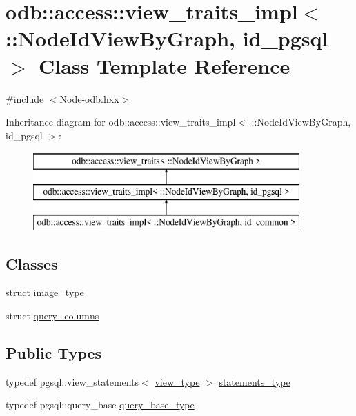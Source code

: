 \hypertarget{classodb_1_1access_1_1view__traits__impl_3_01_1_1_node_id_view_by_graph_00_01id__pgsql_01_4}{}\section{odb\+:\+:access\+:\+:view\+\_\+traits\+\_\+impl$<$ \+:\+:Node\+Id\+View\+By\+Graph, id\+\_\+pgsql $>$ Class Template Reference}
\label{classodb_1_1access_1_1view__traits__impl_3_01_1_1_node_id_view_by_graph_00_01id__pgsql_01_4}


{\ttfamily \#include $<$Node-\/odb.\+hxx$>$}

Inheritance diagram for odb\+:\+:access\+:\+:view\+\_\+traits\+\_\+impl$<$ \+:\+:Node\+Id\+View\+By\+Graph, id\+\_\+pgsql $>$\+:\begin{figure}[H]
\begin{center}
\leavevmode
\includegraphics[height=3.000000cm]{d2/dd4/classodb_1_1access_1_1view__traits__impl_3_01_1_1_node_id_view_by_graph_00_01id__pgsql_01_4}
\end{center}
\end{figure}
\subsection*{Classes}
\begin{DoxyCompactItemize}
\item 
struct \hyperlink{structodb_1_1access_1_1view__traits__impl_3_01_1_1_node_id_view_by_graph_00_01id__pgsql_01_4_1_1image__type}{image\+\_\+type}
\item 
struct \hyperlink{structodb_1_1access_1_1view__traits__impl_3_01_1_1_node_id_view_by_graph_00_01id__pgsql_01_4_1_1query__columns}{query\+\_\+columns}
\end{DoxyCompactItemize}
\subsection*{Public Types}
\begin{DoxyCompactItemize}
\item 
typedef pgsql\+::view\+\_\+statements$<$ \hyperlink{classodb_1_1access_1_1view__traits_3_01_1_1_node_id_view_by_graph_01_4_ab7f6466684b7fbf4cae9f4ca22fec881}{view\+\_\+type} $>$ \hyperlink{classodb_1_1access_1_1view__traits__impl_3_01_1_1_node_id_view_by_graph_00_01id__pgsql_01_4_a97f413f80b7f77bacf9b0fa363498946}{statements\+\_\+type}
\item 
typedef pgsql\+::query\+\_\+base \hyperlink{classodb_1_1access_1_1view__traits__impl_3_01_1_1_node_id_view_by_graph_00_01id__pgsql_01_4_a1394bf86fb77ecf82ccb3f6505fb67ec}{query\+\_\+base\+\_\+type}
\end{DoxyCompactItemize}
